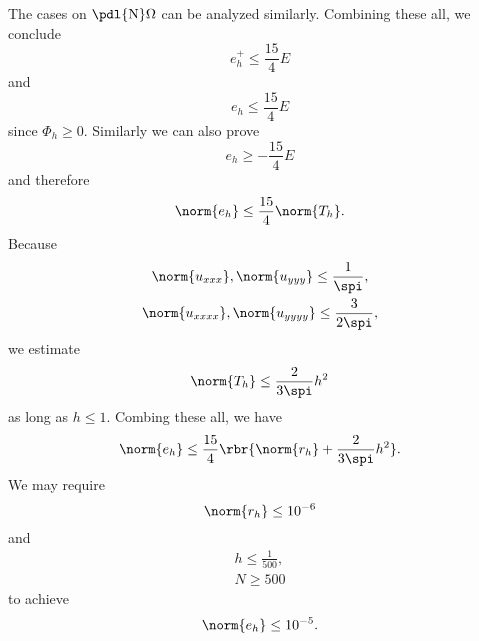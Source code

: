 \documentclass[english, nochinese]{pnote}
\begin{document}
The cases on $ \pdl{\text{N}} \Omega $ can be analyzed similarly. Combining these all, we conclude
\begin{equation}
e^+_h \le \frac{15}{4} E
\end{equation}
and
\begin{equation}
e_h \le \frac{15}{4} E
\end{equation}
since $ \varPhi_h \ge 0 $. Similarly we can also prove
\begin{equation}
e_h \ge -\frac{15}{4} E
\end{equation}
and therefore
\begin{equation}
\norm{e_h} \le \frac{15}{4} \norm{T_h}.
\end{equation}
Because
\begin{gather}
\norm{u_{ x x x }}, \norm{u_{ y y y }} \le \frac{1}{\spi}, \\
\norm{u_{ x x x x }}, \norm{u_{ y y y y }} \le \frac{3}{ 2 \spi },
\end{gather}
we estimate
\begin{equation}
\norm{T_h} \le \frac{2}{ 3 \spi } h^2
\end{equation}
as long as $ h \le 1 $. Combing these all, we have
\begin{equation}
\norm{e_h} \le \frac{15}{4} \rbr{ \norm{r_h} + \frac{2}{ 3 \spi } h^2 }.
\end{equation}
We may require
\begin{equation}
\norm{r_h} \le 10^{-6}
\end{equation}
and
\begin{gather}
h \le \frac{1}{500}, \\
N \ge 500
\end{gather}
to achieve
\begin{equation}
\norm{e_h} \le 10^{-5}.
\end{equation}
\end{document}
